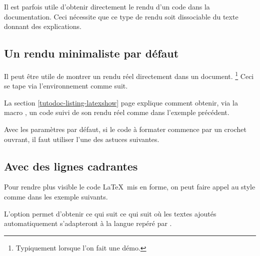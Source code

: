 Il est parfois utile d'obtenir directement le rendu d'un code dans la documentation. Ceci nécessite que ce type de rendu soit dissociable du texte donnant des explications.



\subsection{Un rendu minimaliste par défaut}

\begin{tdocexa}
    Il peut être utile de montrer un rendu réel directement dans un document.%
    \footnote{
        Typiquement lorsque l'on fait une démo.
    }
    Ceci se tape via l'environnement  comme suit.

\end{tdocexa}


\begin{tdocrem}
    La section \ref{tutodoc-listing-latexshow} page \pageref{tutodoc-listing-latexshow} explique comment obtenir, via la macro , un code suivi de son rendu réel comme dans l'exemple précédent.
\end{tdocrem}


\begin{tdocwarn}
    Avec les paramètres par défaut, si le code à formater commence par un crochet ouvrant, il faut utiliser l'une des astuces suivantes.

\end{tdocwarn}


\subsection{Avec des lignes cadrantes}

Pour rendre plus visible le code \LaTeX\ mis en forme, on peut faire appel au style  comme dans les exemple suivants.


\begin{tdocexa}
	L'option  permet d'obtenir ce qui suit ce qui suit où les textes ajoutés automatiquement s'adapteront à la langue repéré par \thisproj.

	
\end{tdocexa}


